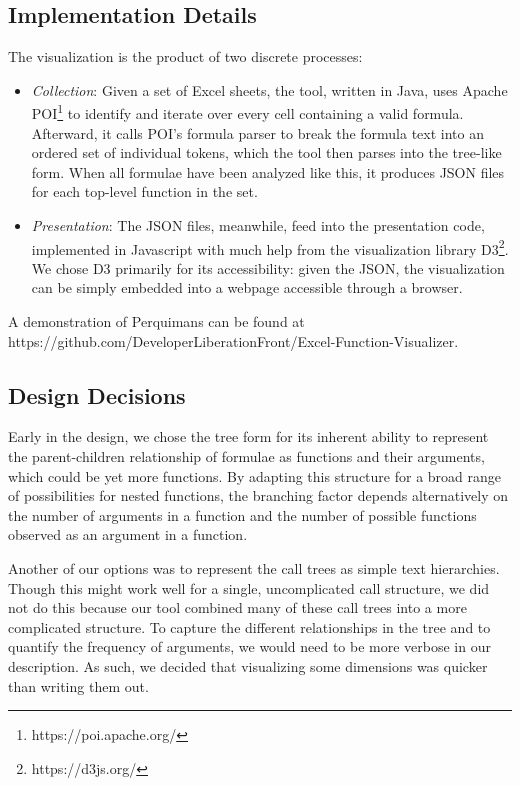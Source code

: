 \documentclass[conference]{IEEEtran}
\newcommand{\toolname}{Perquimans } \newcommand{\toolnameend}{Perquimans}
\begin{document}
	\subsection{Implementation Details} The visualization is the product of two
	discrete processes: \begin{itemize} \item \textit{Collection}: Given a set of
		Excel sheets, the tool, written in Java, uses Apache
		POI\footnote{https://poi.apache.org/} to identify and iterate over every cell
		containing a valid formula. Afterward, it calls POI's formula parser to break
		the formula text into an ordered set of individual tokens, which the tool then
		parses into the tree-like form. When all formulae have been analyzed like this,
		it produces JSON files for each top-level function in the set.
		
		\item \textit{Presentation}: The JSON files, meanwhile, feed into the
		presentation code, implemented in Javascript with much help from the
		visualization library D3\footnote{https://d3js.org/}. We chose D3 primarily
		for its accessibility: given the JSON, the visualization can be simply
		embedded into a webpage accessible through a browser. \end{itemize} A
	demonstration of \toolname can be found at
	https://github.com/DeveloperLiberationFront/Excel-Function-Visualizer.
	
	\subsection{Design Decisions} \label{ssec:decisions} Early in the design, we
	chose the tree form for its inherent ability to represent the parent-children
	relationship of formulae as functions and their arguments, which could be yet
	more functions. By adapting this structure for a broad range of possibilities
	for nested functions, the branching factor depends alternatively on the number
	of arguments in a function and the number of possible functions observed as an
	argument in a function. \par
	
	Another of our options was to represent the call trees as simple text
	hierarchies. Though this might work well for a single, uncomplicated call
	structure, we did not do this because our tool combined many of these call
	trees into a more complicated structure. To capture the different relationships
	in the tree and to quantify the frequency of arguments, we would need to be
	more verbose in our description. As such, we decided that visualizing some
	dimensions was quicker than writing them out. \par
	
\end{document}

